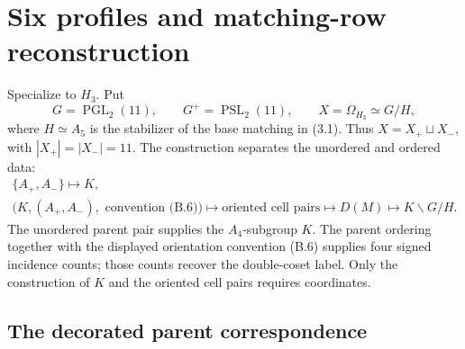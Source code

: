 \documentclass[11pt]{article}
\theoremstyle{definition}
\theoremstyle{remark}
\begin{document}
\section{Six profiles and matching-row reconstruction}
\label{sec:six-profiles}

Specialize to \(H_3\).  Put
\[
 G=\operatorname{PGL}_2(11),\qquad
 G^+=\operatorname{PSL}_2(11),\qquad
 X=\Omega_{H_3}\simeq G/H,
\]
where \(H\simeq A_5\) is the stabilizer of the base matching in
(3.1).  Thus \(X=X_+\sqcup X_-\), with \(|X_+|=|X_-|=11\).
The construction separates the unordered and ordered data:
\[
\begin{gathered}
 \{A_+,A_-\}\longmapsto K,\\
 \bigl(K,(A_+,A_-),\text{ convention (B.6)}\bigr)
 \longmapsto\text{oriented cell pairs}
 \longmapsto D(M)\longmapsto K\backslash G/H.
\end{gathered}
\]
The unordered parent pair supplies the \(A_4\)-subgroup \(K\).  The parent
ordering together with the displayed orientation convention (B.6) supplies
four signed incidence counts; those counts recover the double-coset label.
Only the construction of \(K\) and the oriented cell pairs requires coordinates.

\subsection{The decorated parent correspondence}
\end{document}

